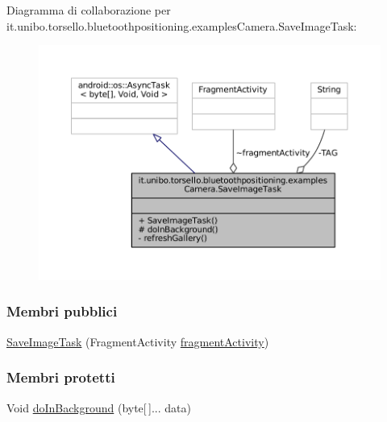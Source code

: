 Diagramma di collaborazione per it.\+unibo.\+torsello.\+bluetoothpositioning.\+examples\+Camera.\+Save\+Image\+Task\+:
\nopagebreak
\begin{figure}[H]
\begin{center}
\leavevmode
\includegraphics[width=350pt]{classit_1_1unibo_1_1torsello_1_1bluetoothpositioning_1_1examplesCamera_1_1SaveImageTask__coll__graph}
\end{center}
\end{figure}
\subsubsection*{Membri pubblici}
\begin{DoxyCompactItemize}
\item 
\hyperlink{classit_1_1unibo_1_1torsello_1_1bluetoothpositioning_1_1examplesCamera_1_1SaveImageTask_a8d08d12c0e15cc34f4dbfcefc0931629_a8d08d12c0e15cc34f4dbfcefc0931629}{Save\+Image\+Task} (Fragment\+Activity \hyperlink{classit_1_1unibo_1_1torsello_1_1bluetoothpositioning_1_1examplesCamera_1_1SaveImageTask_a020c67ae36b7f908c900da193d9cd110_a020c67ae36b7f908c900da193d9cd110}{fragment\+Activity})
\end{DoxyCompactItemize}
\subsubsection*{Membri protetti}
\begin{DoxyCompactItemize}
\item 
Void \hyperlink{classit_1_1unibo_1_1torsello_1_1bluetoothpositioning_1_1examplesCamera_1_1SaveImageTask_ae71e769fead7e2ec11d99922e03a14d9_ae71e769fead7e2ec11d99922e03a14d9}{do\+In\+Background} (byte\mbox{[}$\,$\mbox{]}... data)
\end{DoxyCompactItemize}
